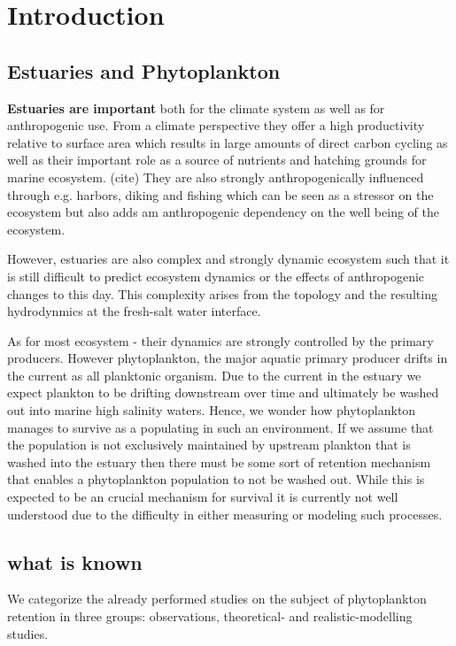 
\section*{Introduction}


\subsection*{Estuaries and Phytoplankton}

\textbf{Estuaries are important} both for the climate system as well as for anthropogenic use.
From a climate perspective they offer a high productivity relative to surface area which results in large amounts of direct carbon cycling as well as their important role as a source of nutrients and hatching grounds for marine ecosystem. (cite)
They are also strongly anthropogenically influenced through e.g. harbors, diking and fishing which can be seen as a stressor on the ecosystem but also adds am anthropogenic dependency on the well being of the ecosystem.

However, estuaries are also complex and strongly dynamic ecosystem such that it is still difficult to predict ecosystem dynamics or the effects of anthropogenic changes to this day.
This complexity arises from the topology and the resulting hydrodynmics at the fresh-salt water interface.

As for most ecosystem - their dynamics are strongly controlled by the primary producers.
However phytoplankton, the major aquatic primary producer drifts in the current as all planktonic organism.
Due to the current in the estuary we expect plankton to be drifting downstream over time and ultimately be washed out into marine high salinity waters.
Hence, we wonder how phytoplankton manages to survive as a populating in such an environment.
If we assume that the population is not exclusively maintained by upstream plankton that is washed into the estuary
 then there must be some sort of retention mechanism that enables a phytoplankton population to not be washed out.
While this is expected to be an crucial mechanism for survival  it is currently not well understood 
due to the difficulty in either measuring or modeling such processes.



\subsection*{what is known}


We categorize the already performed studies on the subject of phytoplankton retention in three groups: observations, theoretical- and realistic-modelling studies.

